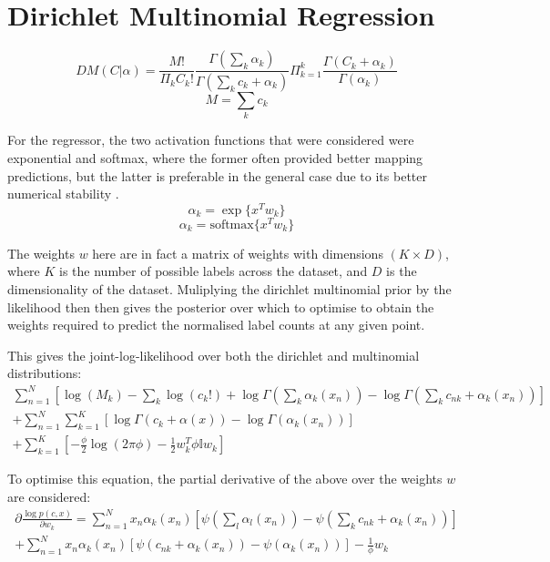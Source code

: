 \section{Dirichlet Multinomial Regression}


$$DM(C|\alpha) = \frac{M!}{\Pi_k C_k!} \frac{\Gamma(\sum_k \alpha_k)}{\Gamma(\sum_k c_k + \alpha_k)} \Pi_{k=1}^k \frac{\Gamma(C_k + \alpha_k)}{\Gamma(\alpha_k)}$$
$$ M = \sum_k c_k $$

For the regressor, the two activation functions that were considered were exponential and softmax, where the former often provided better mapping predictions, but the latter is preferable in the general case due to its better numerical stability .
$$\alpha_k = \exp\{x^T w_k\}$$
$$\alpha_k = \text{softmax}\{x^T w_k\}$$

The weights $w$ here are in fact a matrix of weights with dimensions $(K \times D)$, where $K$ is the number of possible labels across the dataset, and $D$ is the dimensionality of the dataset. Muliplying the dirichlet multinomial prior by the likelihood then then gives the posterior over which to optimise to obtain the weights required to predict the normalised label counts at any given point.

This gives the joint-log-likelihood over both the dirichlet and multinomial distributions:
\begin{multline}
    \sum^N_{n=1} [\log(M_k) - \sum_k \log(c_k!) + \log \Gamma(\sum_k \alpha_k(x_n)) - \log \Gamma(\sum_k c_{nk} + \alpha_k(x_n))] \\
    + \sum^N_{n=1} \sum^K_{k=1} [\log \Gamma(c_k + \alpha(x)) - \log \Gamma(\alpha_k(x_n))] \\
    + \sum^K_{k=1} [-\frac{\phi}{2} \log(2\pi \phi) - \frac{1}{2}w_k^T \phi \mathbb{I} w_k]
\end{multline}

To optimise this equation, the partial derivative of the above over the weights $w$ are considered:
\begin{multline}
    \partial \frac{\log p(c, x)}{\partial w_k} = \sum_{n=1}^N x_n \alpha_k (x_n) [\psi(\sum_l \alpha_l(x_n)) - \psi(\sum_k c_{nk} + \alpha_k(x_n))] \\
    + \sum^N_{n=1} x_n \alpha_k (x_n) [\psi (c_{nk} + \alpha_k(x_n)) - \psi(\alpha_k(x_n))] - \frac{1}{\phi} w_k
\end{multline}


